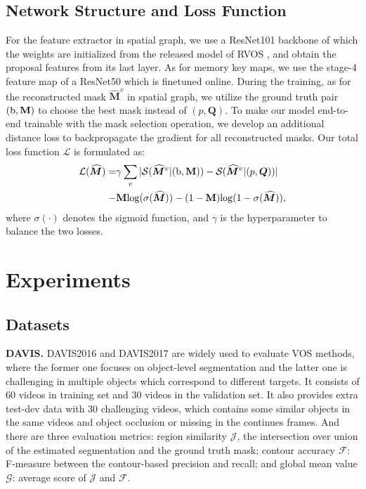 \documentclass[letterpaper]{article} %
\begin{document}
\subsection{Network Structure and Loss Function}
For the feature extractor in spatial graph, we use a ResNet101 backbone of which the weights are initialized from the released model of RVOS \cite{ventura2019rvos}, and obtain the proposal features from its last layer. As for memory key maps, we use the stage-4 feature map of a ResNet50 which is finetuned online. During the training, as for the reconstructed mask $\widehat{\bm{M}}^{v}$ in spatial graph, we utilize the ground truth pair $(\rm{b}, \textbf{M})$ to choose the best mask instead of $(p,\bm{Q})$. To make our model end-to-end trainable with the mask selection operation, we develop an additional distance loss to backpropagate the gradient for all reconstructed masks. Our total loss function $\mathcal{L}$ is formulated as:
\begin{align}
    \mathcal{L}(\widehat{\bm{M}}) = & \gamma\sum_{v} |{\mathcal{S}}(\widehat{\bm{M}}^{v}|({\rm{b}, \textbf{M}}))-{\mathcal{S}}(\widehat{\bm{M}}^{v}|({p, \bm{Q}}))| \nonumber\\
    - & {\rm \textbf{M}}{\rm log}(\sigma(\widehat{\bm{M}})) - (1-{\rm \textbf{M}}){\rm log}(1-\sigma(\widehat{\bm{M}})),
\label{eq:loss}
\end{align}
where $\sigma(\cdot)$ denotes the sigmoid function, and $\gamma$ is the hyperparameter to balance the two losses.

\section{Experiments}
\subsection{Datasets}
\textbf{DAVIS.} DAVIS2016 and DAVIS2017 \cite{pont20172017} are widely used to evaluate VOS methods, where the former one focuses on object-level segmentation and the latter one is challenging in multiple objects which correspond to different targets.
It consists of 60 videos in training set and 30 videos in the validation set. It also provides extra test-dev data with 30 challenging videos, which contains some similar objects in the same videos and object occlusion or missing in the continues frames.
And there are three evaluation metrics: region similarity $\mathcal{J}$, the intersection over union of the estimated segmentation and the ground truth mask; contour accuracy $\mathcal{F}$: F-measure between the contour-based precision and recall; and global mean value $\mathcal{G}$: average score of $\mathcal{J}$ and $\mathcal{F}$.
\end{document}
